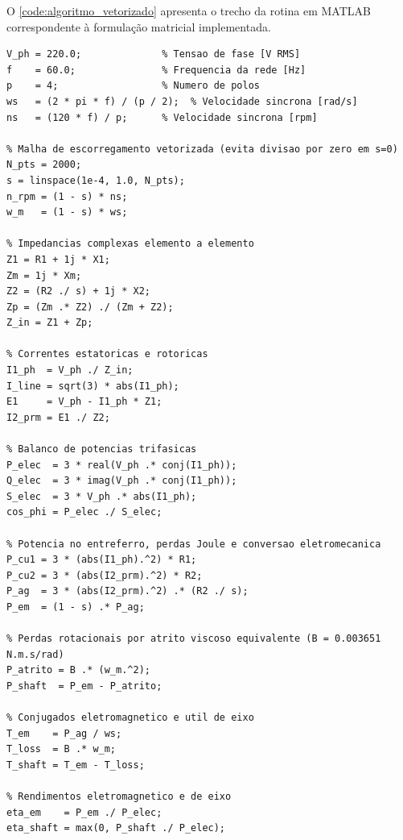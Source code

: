 O \cref{code:algoritmo_vetorizado} apresenta o trecho da rotina em MATLAB correspondente à formulação matricial implementada.

\begin{lstlisting}[style=matlabstyle, caption={Rotina vetorizada em MATLAB para resolucao analitica do circuito equivalente.}, label={code:algoritmo_vetorizado}]
% Parametros por fase em conexao Triangulo (Delta)
V_ph = 220.0;              % Tensao de fase [V RMS]
f    = 60.0;               % Frequencia da rede [Hz]
p    = 4;                  % Numero de polos
ws   = (2 * pi * f) / (p / 2);  % Velocidade sincrona [rad/s]
ns   = (120 * f) / p;      % Velocidade sincrona [rpm]

% Malha de escorregamento vetorizada (evita divisao por zero em s=0)
N_pts = 2000;
s = linspace(1e-4, 1.0, N_pts);
n_rpm = (1 - s) * ns;
w_m   = (1 - s) * ws;

% Impedancias complexas elemento a elemento
Z1 = R1 + 1j * X1;
Zm = 1j * Xm;
Z2 = (R2 ./ s) + 1j * X2;
Zp = (Zm .* Z2) ./ (Zm + Z2);
Z_in = Z1 + Zp;

% Correntes estatoricas e rotoricas
I1_ph  = V_ph ./ Z_in;
I_line = sqrt(3) * abs(I1_ph);
E1     = V_ph - I1_ph * Z1;
I2_prm = E1 ./ Z2;

% Balanco de potencias trifasicas
P_elec  = 3 * real(V_ph .* conj(I1_ph));
Q_elec  = 3 * imag(V_ph .* conj(I1_ph));
S_elec  = 3 * V_ph .* abs(I1_ph);
cos_phi = P_elec ./ S_elec;

% Potencia no entreferro, perdas Joule e conversao eletromecanica
P_cu1 = 3 * (abs(I1_ph).^2) * R1;
P_cu2 = 3 * (abs(I2_prm).^2) * R2;
P_ag  = 3 * (abs(I2_prm).^2) .* (R2 ./ s);
P_em  = (1 - s) .* P_ag;

% Perdas rotacionais por atrito viscoso equivalente (B = 0.003651 N.m.s/rad)
P_atrito = B .* (w_m.^2);
P_shaft  = P_em - P_atrito;

% Conjugados eletromagnetico e util de eixo
T_em    = P_ag / ws;
T_loss  = B .* w_m;
T_shaft = T_em - T_loss;

% Rendimentos eletromagnetico e de eixo
eta_em    = P_em ./ P_elec;
eta_shaft = max(0, P_shaft ./ P_elec);
\end{lstlisting}

